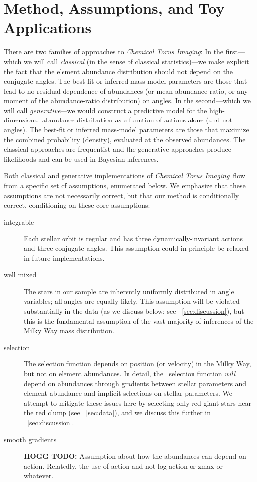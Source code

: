 \documentclass[modern]{aastex63}
\newcommand{\methodname}{\textsl{Chemical Torus Imaging}}
\newcommand{\apogee}{\acronym{APOGEE}}
\newcommand{\HOGGTODO}[1]{{\color{tabred}\textbf{HOGG TODO:} #1}}
\begin{document}
\section{Method, Assumptions, and Toy Applications}
\label{sec:inferences}

There are two families of approaches to \methodname:
In the first---which we will call \emph{classical} (in the sense of classical
statistics)---we make explicit the fact that the element abundance distribution
should not depend on the conjugate angles.
The best-fit or inferred mass-model parameters are those that lead to no
residual dependence of abundances (or mean abundance ratio, or any moment of the
abundance-ratio distribution) on angles.
In the second---which we will call \emph{generative}---we would construct a
predictive model for the high-dimensional abundance distribution as a function
of actions alone (and not angles).
The best-fit or inferred mass-model parameters are those that maximize the
combined probability (density), evaluated at the observed abundances.
The classical approaches are frequentist and the generative approaches produce
likelihoods and can be used in Bayesian inferences.

Both classical and generative implementations of \methodname\ flow from a
specific set of assumptions, enumerated below.
We emphasize that these assumptions are not necessarily correct, but that our
method is conditionally correct, conditioning on these core assumptions:
\begin{description}
\item[integrable] Each stellar orbit is regular and has three
  dynamically-invariant actions and three conjugate angles. This assumption
  could in principle be relaxed in future implementations.

\item[well mixed] The stars in our sample are inherently uniformly distributed
  in angle variables; all angles are equally likely. This assumption will be
  violated substantially in the data (as we discuss below; see
  \sectionname~\ref{sec:discussion}), but this is the fundamental assumption of
  the vast majority of inferences of the Milky Way mass distribution.

\item[selection] The selection function depends on position (or velocity) in the
  Milky Way, but not on element abundances. In detail, the \apogee\ selection
  function \emph{will} depend on abundances through gradients between stellar
  parameters and element abundance and implicit selections on stellar
  parameters. We attempt to mitigate these issues here by selecting only red
  giant stars near the red clump (see \sectionname~\ref{sec:data}), and we
  discuss this further in \sectionname~\ref{sec:discussion}.

\item[smooth gradients] \HOGGTODO{Assumption about how the abundances can
  depend on action.} Relatedly, the use of action and not log-action
  or zmax or whatever.
\end{description}
\end{document}
